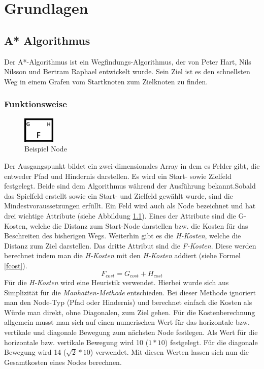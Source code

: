 \chapter{Grundlagen}
\label{sec:fundamentals}
\section{A* Algorithmus}
\label{sec:fundamentalsA*}
Der A*-Algorithmus ist ein Wegfindungs-Algorithmus, der von Peter Hart, Nils Nilsson und Bertram Raphael entwickelt wurde. Sein Ziel ist es den schnellsten Weg in einem Grafen vom Startknoten zum Zielknoten zu finden. 
\subsection{Funktionsweise}
\begin{figure}
    \includegraphics[width=1.5cm]{assets/aStarNode.png}
    \caption{Beispiel Node}
    \label{fig:aStarNode}
\end{figure}
Der Ausgangspunkt bildet ein zwei-dimensionales Array in dem es Felder gibt, die entweder Pfad und Hindernis darstellen. Es wird ein Start- sowie Zielfeld festgelegt. Beide sind dem Algorithmus während der Ausführung bekannt.Sobald das Spielfeld erstellt sowie ein Start- und Zielfeld gewählt wurde, sind die Mindestvoraussetzungen erfüllt. Ein Feld wird auch als Node bezeichnet und hat drei wichtige Attribute (siehe Abbildung \ref{fig:aStarNode}). Eines der Attribute sind die G-Kosten, welche die Distanz zum Start-Node darstellen bzw. die Kosten für das Beschreiten des bisherigen Wegs. Weiterhin gibt es die \textit{H-Kosten}, welche die Distanz zum Ziel darstellen. Das dritte Attribut sind die \textit{F-Kosten}. Diese werden berechnet indem man die \textit{H-Kosten} mit den \textit{H-Kosten} addiert (siehe Formel \ref{fcost}).
\begin{equation}
F_{cost} = G_{cost} + H_{cost}
\label{fcost}
\end{equation}
Für die \textit{H-Kosten} wird eine Heuristik verwendet. Hierbei wurde sich aus Simplizität für die \textit{Manhatten-Methode} entschieden. Bei dieser Methode ignoriert man den Node-Typ (Pfad oder Hindernis) und berechnet einfach die Kosten als Würde man direkt, ohne Diagonalen, zum Ziel gehen. Für die Kostenberechnung allgemein musst man sich auf einen numerischen Wert für das horizontale bzw. vertikale und diagonale Bewegung zum nächsten Node festlegen. Als Wert für die horizontale bzw. vertikale Bewegung wird 10 ($1*10$) festgelegt. Für die diagonale Bewegung wird 14 ($\sqrt{2}*10$) verwendet. Mit diesen Werten lassen sich nun die Gesamtkosten eines Nodes berechnen.

